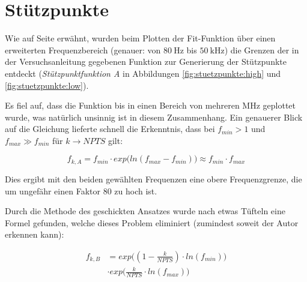 {%
    \clearpage
    \pdfpagewidth
	\textwidth
    \addtolength{\textwidth}{70mm}
    \section{St\"utzpunkte}
    \label{app:points}
    \begin{minipage}[t]{.30\textwidth}
        Wie auf Seite \pageref{tab:meas:steel}  erw\"ahnt, wurden beim Plotten
        der  Fit-Funktion \"uber  einen erweiterten  Frequenzbereich (genauer:
        von  $\SI{80}{\hertz}$  bis  $\SI{50}{\kilo\hertz}$) die  Grenzen  der
        in  der  Versuchsanleitung  gegebenen  Funktion  zur  Generierung  der
        St\"utzpunkte entdeckt  (\emph{St\"utzpunktfunktion A}  in Abbildungen
        \ref{fig:stuetzpunkte:high} und \ref{fig:stuetzpunkte:low}).

        Es  fiel auf,  dass die  Funktion bis  in einen  Bereich von  mehreren
        $\si{\mega\hertz}$ geplottet  wurde, was  nat\"urlich unsinnig  ist in
        diesem Zusammenhang. Ein  genauerer Blick  auf die  Gleichung lieferte
        schnell  die  Erkenntnis, dass  bei  $f_{min}  >  1$ und  $f_{max} \gg
        f_{min}$ f\"ur $k \rightarrow NPTS$ gilt:

        \begin{equation*}
            f_{k,A} = f_{min} \cdot exp\Biggl( ln(f_{max} - f_{min}) \Biggr) \approx f_{min} \cdot f_{max}
        \end{equation*}

        Dies  ergibt   mit  den  beiden  gew\"ahlten   Frequenzen  eine  obere
        Frequenzgrenze, die um ungef\"ahr einen Faktor $\num{80}$ zu hoch ist.

        Durch die Methode des geschickten  Ansatzes wurde nach etwas T\"ufteln
        eine  Formel gefunden,  welche  dieses  Problem eliminiert  (zumindest
        soweit der Autor erkennen kann):

        \begin{equation*}
            \begin{split}
                f_{k,B} & = exp\Biggl( (1-\frac{k}{NPTS}) \cdot ln(f_{min}) \Biggr) \\
                & \cdot exp\Biggl( \frac{k}{NPTS} \cdot ln(f_{max}) \Biggr)
            \end{split}
        \end{equation*}


\end{minipage}}
